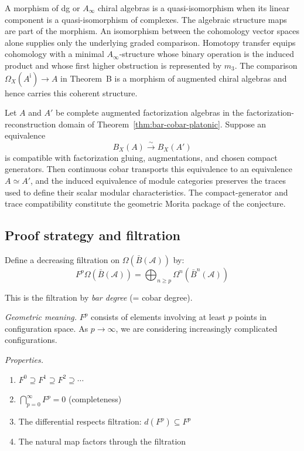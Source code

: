 \begin{remark}
\label{rem:qi-vs-homology-iso}
A morphism of dg or \(A_\infty\) chiral algebras is a
quasi-isomorphism when its linear component is a quasi-isomorphism of
complexes.  The algebraic structure maps are part of the morphism.
An isomorphism between the cohomology vector spaces alone supplies
only the underlying graded comparison.  Homotopy transfer equips
cohomology with a minimal \(A_\infty\)-structure whose binary
operation is the induced product and whose first higher obstruction
is represented by \(m_3\).  The comparison
\(\Omega_X(A^{\mathrm i})\to A\) in Theorem~B is a morphism of
augmented chiral algebras and hence carries this coherent structure.
\end{remark}

\begin{conjecture}
\label{conj:bar-morita-koszul-conductor}
Let \(A\) and \(A'\) be complete augmented factorization algebras in
the factorization-reconstruction domain of
Theorem~\ref{thm:bar-cobar-platonic}.  Suppose an equivalence
\[
B_X(A)\xrightarrow{\sim}B_X(A')
\]
is compatible with factorization gluing, augmentations, and chosen
compact generators.  Then continuous cobar transports this
equivalence to an equivalence \(A\simeq A'\), and the induced
equivalence of module categories preserves the traces used to define
their scalar modular characteristics.  The compact-generator and
trace compatibility constitute the geometric Morita package of the
conjecture.
\end{conjecture}

\subsection{Proof strategy and filtration}

\begin{definition}\label{def:bar-cobar-filtration}
Define a decreasing filtration on $\Omega(\bar{B}(\mathcal{A}))$ by:
\[F^p\Omega(\bar{B}(\mathcal{A})) = \bigoplus_{n \geq p} \Omega^n(\bar{B}^n(\mathcal{A}))\]

This is the filtration by \emph{bar degree} (= cobar degree).

\emph{Geometric meaning.} $F^p$ consists of elements involving at least $p$ points
in configuration space. As $p \to \infty$, we are considering increasingly complicated
configurations.

\emph{Properties.}
\begin{enumerate}
\item $F^0 \supseteq F^1 \supseteq F^2 \supseteq \cdots$
\item $\bigcap_{p=0}^\infty F^p = 0$ (completeness)
\item The differential respects filtration: $d(F^p) \subseteq F^p$
\item The natural map factors through the filtration
\end{enumerate}
\end{definition}


